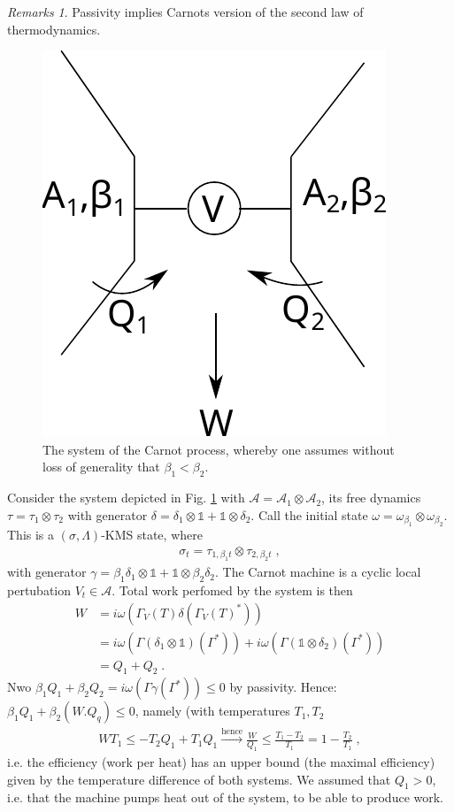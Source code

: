 \documentclass[
a4paper, %
11pt, %
onecolumn, %
openany, %
]{memoir}
\theoremstyle{definition}
\theoremstyle{remark}
\newtheorem{remarks}{Remarks}[chapter]
\theoremstyle{plain}
\begin{document}
\begin{remarks}
Passivity implies Carnots version of the second law of thermodynamics. 
\begin{figure}
\centering
\includegraphics[scale=1]{carnot.pdf}
\caption{The system of the Carnot process, whereby one assumes without loss of generality that $\beta_1<\beta_2$.\label{fig::carnot}}
\end{figure}
Consider the system depicted in Fig. \ref{fig::carnot} with $\mathcal{A}=\mathcal{A}_1\otimes \mathcal{A}_2$, its free dynamics $\tau=\tau_1\otimes\tau_2$ with generator $\delta=\delta_1\otimes\mathds{1}+\mathds{1}\otimes\delta_2$. Call the initial state $\omega=\omega_{\beta_1}\otimes\omega_{\beta_2}$. This is a $(\sigma, \Lambda)$-KMS state, where\begin{align}
\sigma_t=\tau_{1,\beta_1t}\otimes \tau_{2,\beta_2t}\; ,
\end{align}
with generator $\gamma=\beta_1\delta_1\otimes\mathds{1}+\mathds{1}\otimes \beta_2\delta_2$. The Carnot machine is a cyclic local pertubation $V_t\in \mathcal{A}$. Total work perfomed by the system is then \begin{align}
W&=i\omega(\Gamma_V(T)\delta(\Gamma_V(T)^*))\\
&=i\omega(\Gamma(\delta_1\otimes\mathds{1})(\Gamma^*))+i\omega(\Gamma(\mathds{1}\otimes\delta_2)(\Gamma^*))\\
&=Q_1+Q_2\;.
\end{align}
Nwo $\beta_1 Q_1+\beta_2Q_2=i\omega(\Gamma\gamma(\Gamma^*))\leq 0$ by passivity. Hence: $\beta_1 Q_1+\beta_2(W.Q_q)\leq 0$, namely (with temperatures $T_1,T_2$\begin{align}
WT_1\leq -T_2Q_1+T_1Q_1 \overset{\text{hence}}{\longrightarrow} \frac{W}{Q_1}\leq \frac{T_1-T_2}{T_1}=1-\frac{T_2}{T_1}\; ,
\end{align}
i.e. the efficiency (work per heat) has an upper bound (the maximal efficiency) given by the temperature difference of both systems. We assumed that $Q_1>0$, i.e. that the machine pumps heat out of the system, to be able to produce work.
\end{remarks}
\end{document}
